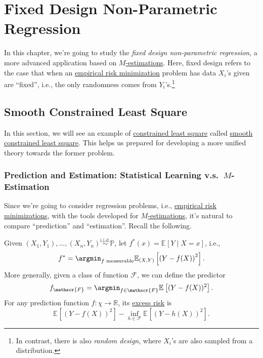 
\chapter{Fixed Design Non-Parametric Regression}
In this chapter, we're going to study the \emph{fixed design non-parametric regression}, a more advanced application based on \hyperref[prb:M-estimation]{\(M\)-estimations}. Here, fixed design refers to the case that when an \hyperref[prb:ERM]{empirical risk minimization} problem has data \(X_i\)'s given are ``fixed'', i.e., the only randomness comes from \(Y_i\)'s.\footnote{In contrast, there is also \emph{random design}, where \(X_i\)'s are also sampled from a distribution.}

\section{Smooth Constrained Least Square}
In this section, we will see an example of \hyperref[prb:constrained-LS]{constrained least square} called \hyperref[prb:smooth-LS]{smooth constrained least square}. This helps us prepared for developing  a more unified theory towards the former problem.

\subsection{Prediction and Estimation: Statistical Learning v.s.\ \(M\)-Estimation}
Since we're going to consider regression problems, i.e., \hyperref[prb:ERM]{empirical risk minimizations}, with the tools developed for \hyperref[prb:M-estimation]{\(M\)-estimations}, it's natural to compare ``prediction'' and ``estimation''. Recall the following.

\begin{prev}[Prediction]
	Given \((X_1, Y_1), \dots , (X_n, Y_n) \overset{\text{i.i.d.} }{\sim } \mathbb{P} \), let \(f^{\ast} (x) = \mathbb{E}_{}\left[Y \mid X = x \right] \), i.e.,
	\[
		f^{\ast} = \argmin_{f \text{ measurable} } \mathbb{E}_{(X, Y)}\left[ \left( Y - f(X)  \right) ^2 \right] .
	\]
	More generally, given a class of function \(\mathscr{F} \), we can define the predictor
	\[
		f_{\mathscr{F} } = \argmin_{f\in \mathscr{F} } \mathbb{E}_{}\left[ ( Y - f(X) ) ^2 \right] .
	\]
	For any prediction function \(f\colon \chi \to \mathbb{R} \), its \hyperref[def:excess-risk]{excess risk} is
	\[
		\mathbb{E}_{}\left[ ( Y - f(X) ) ^2 \right] - \inf _{h \in \mathscr{F} } \mathbb{E}_{}\left[( Y - h(X) ) ^2 \right] .
	\]
\end{prev}

